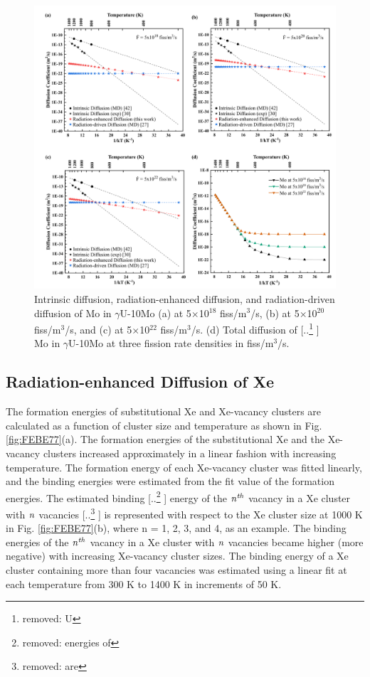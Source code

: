 \documentclass[preprint,12pt]{elsarticle}
\providecommand{\DIFadd}[1]{{\protect\color{blue} \sf #1}} %
\providecommand{\DIFdel}[1]{{\protect\color{red} [..\footnote{removed: #1} ]}} %
\providecommand{\DIFaddbegin}{} %
\providecommand{\DIFaddend}{} %
\providecommand{\DIFdelbegin}{} %
\providecommand{\DIFdelend}{} %
\providecommand{\DIFaddFL}[1]{\DIFadd{#1}} %
\providecommand{\DIFdelFL}[1]{\DIFdel{#1}} %
\providecommand{\DIFaddbeginFL}{} %
\providecommand{\DIFaddendFL}{} %
\providecommand{\DIFdelbeginFL}{} %
\providecommand{\DIFdelendFL}{} %
\newcommand{\DIFscaledelfig}{0.5}
\newlength{\DIFdelgraphicswidth} %
\newlength{\DIFdelgraphicsheight} %
\newcommand{\DIFaddincludegraphics}[2][]{{\color{blue}\fbox{\DIFOincludegraphics[#1]{#2}}}} %
\newcommand{\DIFdelincludegraphics}[2][]{%
\sbox{\DIFdelgraphicsbox}{\DIFOincludegraphics[#1]{#2}}%
\settoboxwidth{\DIFdelgraphicswidth}{\DIFdelgraphicsbox} %
\settoboxtotalheight{\DIFdelgraphicsheight}{\DIFdelgraphicsbox} %
\scalebox{\DIFscaledelfig}{%
\parbox[b]{\DIFdelgraphicswidth}{\usebox{\DIFdelgraphicsbox}\\[-\baselineskip] \rule{\DIFdelgraphicswidth}{0em}}\llap{\resizebox{\DIFdelgraphicswidth}{\DIFdelgraphicsheight}{%
\setlength{\unitlength}{\DIFdelgraphicswidth}%
\begin{picture}(1,1)%
\thicklines\linethickness{2pt} %
{\color[rgb]{1,0,0}\put(0,0){\framebox(1,1){}}}%
{\color[rgb]{1,0,0}\put(0,0){\line( 1,1){1}}}%
{\color[rgb]{1,0,0}\put(0,1){\line(1,-1){1}}}%
\end{picture}%
}\hspace*{3pt}}} %
} %
\DeclareRobustCommand{\DIFaddbegin}{\DIFOaddbegin \let\includegraphics\DIFaddincludegraphics} %
\DeclareRobustCommand{\DIFaddend}{\DIFOaddend \let\includegraphics\DIFOincludegraphics} %
\DeclareRobustCommand{\DIFdelbegin}{\DIFOdelbegin \let\includegraphics\DIFdelincludegraphics} %
\DeclareRobustCommand{\DIFdelend}{\DIFOaddend \let\includegraphics\DIFOincludegraphics} %
\DeclareRobustCommand{\DIFaddbeginFL}{\DIFOaddbeginFL \let\includegraphics\DIFaddincludegraphics} %
\DeclareRobustCommand{\DIFaddendFL}{\DIFOaddendFL \let\includegraphics\DIFOincludegraphics} %
\DeclareRobustCommand{\DIFdelbeginFL}{\DIFOdelbeginFL \let\includegraphics\DIFdelincludegraphics} %
\DeclareRobustCommand{\DIFdelendFL}{\DIFOaddendFL \let\includegraphics\DIFOincludegraphics} %
\begin{document}
\begin{figure}[hbt!]
\centering
\includegraphics[width=1\textwidth]{Fig6.png}
\caption{Intrinsic diffusion, radiation-enhanced diffusion, and radiation-driven diffusion of Mo in $\gamma$U-10Mo (a) at 5$\times$10$^{18}$ fiss/m$^{3}$/s, (b) at 5$\times$10$^{20}$ fiss/m$^{3}$/s, and (c) at 5$\times$10$^{22}$ fiss/m$^{3}$/s. (d) Total diffusion of \DIFdelbeginFL \DIFdelFL{U }\DIFdelendFL \DIFaddbeginFL \DIFaddFL{Mo }\DIFaddendFL in $\gamma$U-10Mo at three fission rate densities in fiss/m$^{3}$/s.}
\label{fig:eachMo}
\end{figure}

\FloatBarrier

\subsection{Radiation-enhanced Diffusion of Xe}
The formation energies of substitutional Xe and Xe-vacancy clusters are calculated as a function of cluster size and temperature as shown in Fig. \ref{fig:FEBE77}(a). The formation energies of the substitutional Xe and the Xe-vacancy clusters increased approximately in a linear fashion with increasing temperature. The formation energy of each Xe-vacancy cluster was fitted linearly, and the binding energies were estimated from the fit value of the formation energies. The estimated binding \DIFdelbegin \DIFdel{energies of }\DIFdelend \DIFaddbegin \DIFadd{energy of the }\DIFaddend $\it{n}^{th}$ vacancy in a Xe cluster with $\it{n}$ vacancies \DIFdelbegin \DIFdel{are }\DIFdelend \DIFaddbegin \DIFadd{is }\DIFaddend represented with respect to the Xe cluster size at 1000 K in Fig. \ref{fig:FEBE77}(b), where n = 1, 2, 3, and 4, as an example. The binding energies of the $\it{n}^{th}$ vacancy in a Xe cluster with $\it{n}$ vacancies became higher (more negative) with increasing Xe-vacancy cluster sizes. The binding energy of a Xe cluster containing more than four vacancies was estimated using a linear fit at each temperature from 300 K to 1400 K in increments of 50 K. 
\end{document}
